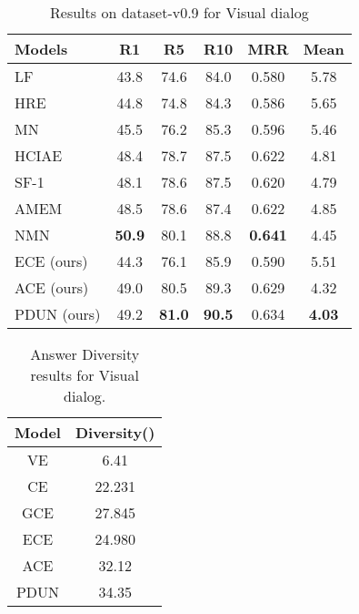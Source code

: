 \documentclass[review]{elsarticle}
\begin{document}
\begin{table*}[htb]
\begin{center}
		\begin{tabular}{|l|ccccc | } \hline
			
			\textbf{Models}	 & \textbf{R1} & \textbf{R5} & \textbf{R10} & \textbf{MRR} & \textbf{Mean}\\ \hline 	
			LF \cite{Das_CVPR2017}  &43.8& 74.6& 84.0 &0.580 &5.78 \\
			HRE \cite{Das_CVPR2017}  &44.8&74.8 &84.3&0.586& 5.65\\
			MN \cite{Das_CVPR2017} &45.5& 76.2& 85.3 & 0.596&5.46\\
			HCIAE \cite{lu2017best} &48.4 &78.7 &87.5&0.622 &4.81\\
			SF-1 \cite{jain2018two}  &48.1 &78.6 &87.5 &0.620&4.79\\
			AMEM \cite{seo2017visual} & 48.5 &78.6& 87.4&0.622&4.85\\
			NMN \cite{kottur2018visual} &\textbf{50.9}& 80.1 &88.8& \textbf{0.641}& 4.45  \\\hline
			ECE  (ours)   &44.3  & 76.1  &85.9 &0.590 & 5.51\\
			ACE (ours)   &49.0  & 80.5  &89.3 &0.629& 4.32\\  
			PDUN (ours) &49.2  & \textbf{81.0} &\textbf{90.5}  &0.634 & \textbf{4.03}\\\hline
		\end{tabular}
	\end{center}
	\vspace{-1em}
	\caption{\label{score_tab_1}Results on dataset-v0.9 for Visual dialog }
\end{table*}














\begin{table}[ht]
	\centering
\begin{tabular}{|c|c|}
		\hline
		\textbf{Model} & \textbf{Diversity()} \\
		\hline
		VE  & 6.41 \\
		CE  & 22.231 \\
		GCE & 27.845 \\
ECE  &  24.980 \\
		ACE  & 32.12 \\
		PDUN & 34.35 \\
		\hline
\end{tabular}
	\vspace{-1em}
	\caption{\label{tab_diversity} Answer Diversity results for Visual dialog.}
\end{table}
\end{document}
